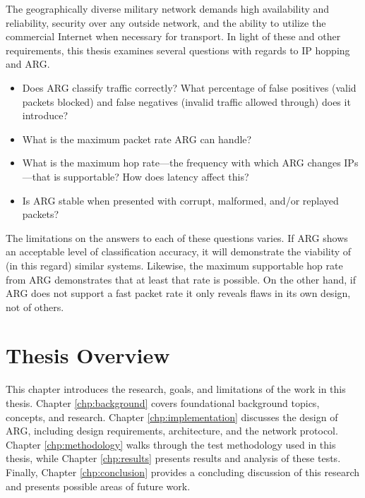 \par The geographically diverse military network demands high availability and reliability, security over any outside network, and the ability to utilize the commercial Internet when necessary for transport. In light of these and other requirements, this thesis examines several questions with regards to \ac{IP} hopping and \ac{ARG}.
\begin{itemize}
	\item Does \ac{ARG} classify traffic correctly? What percentage of false positives (valid packets blocked) and false negatives (invalid traffic allowed through) does it introduce?
	\item What is the maximum packet rate \ac{ARG} can handle?
	\item What is the maximum hop rate---the frequency with which \ac{ARG} changes \acp{IP}---that is supportable? How does latency affect this?
	\item Is \ac{ARG} stable when presented with corrupt, malformed, and/or replayed packets?
\end{itemize}

\par The limitations on the answers to each of these questions varies. If \ac{ARG} shows an acceptable level of classification accuracy, it will demonstrate the viability of (in this regard) similar systems. Likewise, the maximum supportable hop rate from \ac{ARG} demonstrates that at least that rate is possible. On the other hand, if \ac{ARG} does not support a fast packet rate it only reveals flaws in its own design, not of others. 


\section{Thesis Overview}
\par This chapter introduces the research, goals, and limitations of the work in this thesis. Chapter \ref{chp:background} covers foundational background topics, concepts, and research. Chapter \ref{chp:implementation} discusses the design of \ac{ARG}, including design requirements, architecture, and the network protocol. Chapter \ref{chp:methodology} walks through the test methodology used in this thesis, while Chapter \ref{chp:results} presents results and analysis of these tests. Finally, Chapter \ref{chp:conclusion} provides a concluding discussion of this research and presents possible areas of future work.


